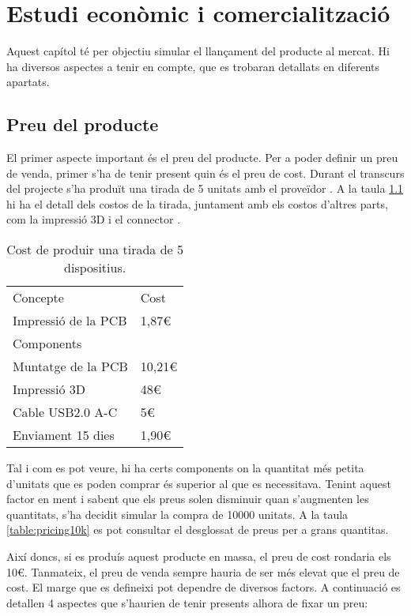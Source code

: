 \chapter{Estudi econòmic i comercialització}
\label{cap:economia}

Aquest capítol té per objectiu simular el llançament del producte al mercat.
Hi ha diversos aspectes a tenir en compte, que es trobaran detallats en
diferents apartats.

\section{Preu del producte}

El primer aspecte important és el preu del producte. Per a poder definir un
preu de venda, primer s'ha de tenir present quin és el preu de cost. Durant
el transcurs del projecte s'ha produït una tirada de 5 unitats amb el
proveïdor . A la taula \ref{table:jlcpcb} hi ha el detall dels
costos de la tirada, juntament amb els costos d'altres parts, com la impressió
3D i el connector .

\begin{table}[]
\begin{tabular}{ll}
    Concepte            & Cost   \\
    Impressió de la PCB & 1,87€  \\
    Components          &        \\
    Muntatge de la PCB  & 10,21€ \\
    Impressió 3D        & 48€    \\
    Cable USB2.0 A-C    & 5€     \\
    Enviament 15 dies   & 1,90€ 
\end{tabular}
\label{table:jlcpcb}
\caption{Cost de produir una tirada de 5 dispositius.}
\end{table}

Tal i com es pot veure, hi ha certs components on la quantitat més petita
d'unitats que es poden comprar és superior al que es necessitava. Tenint aquest
factor en ment i sabent que els preus solen disminuir quan s'augmenten les
quantitats, s'ha decidit simular la compra de 10000 unitats. A la taula
\ref{table:pricing10k} es pot consultar el desglossat de preus per a
grans quantitas.


Així doncs, si es produís aquest producte en massa, el preu de cost rondaria
els 10€. Tanmateix, el preu de venda sempre hauria de ser més elevat que
el preu de cost. El marge que es defineixi pot dependre de diversos factors.
A continuació es detallen 4 aspectes que s'haurien de tenir presents alhora de
fixar un preu:

